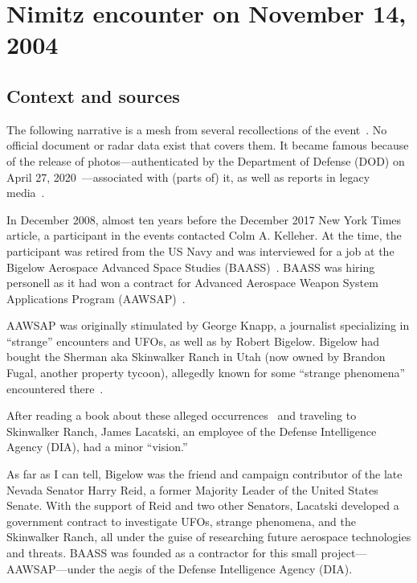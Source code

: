 \section{Nimitz encounter on November 14, 2004}
\label{2023-UFO-part-History-chapter-2004-2023-Nimitz}

\subsection{Context and sources}

The following narrative is a mesh from several recollections of the event~\cite{NimitzSCURep2019Mar,Chierici2015Mar,Mizokami2017Dec,Powerfuljre2019Oct}.
No official document or radar data exist that covers them. It became famous because of the release of photos---authenticated by the Department of Defense (DOD) on April 27, 2020~\cite{DOD2020}---associated with (parts of) it, as well as reports in legacy media~\cite{CooperNYT2017,BryanBender2017}.

In December 2008, almost ten years before the December 2017 New York Times article,
a participant in the events contacted Colm A. Kelleher.
At the time, the participant was retired from the US Navy and was interviewed for a job at the
Bigelow Aerospace Advanced Space Studies (BAASS)~\cite[p.~41]{Lacatski-2021}.
BAASS was hiring personell as it had won a contract for
Advanced Aerospace Weapon System Applications Program (AAWSAP)~\cite{AAWSAP2008}.

AAWSAP was originally stimulated by George Knapp, a journalist specializing in ``strange'' encounters and UFOs,
as well as by Robert Bigelow. Bigelow had bought the
Sherman aka Skinwalker Ranch in Utah (now owned by Brandon Fugal, another property tycoon),
allegedly known for some ``strange phenomena'' encountered there~\cite{ShaefferSkeptic2022May}.

After reading a book about these alleged occurrences~\cite{ColmA.Kelleher2009Jul} and traveling to
Skinwalker Ranch, James Lacatski, an employee of the Defense Intelligence Agency (DIA),
 had a minor ``vision.''

As far as I can tell, Bigelow was the friend and campaign contributor of the late
Nevada Senator Harry Reid, a former Majority Leader of the United States Senate.
With the support of Reid and two other Senators,
Lacatski developed a government contract to investigate UFOs,
strange phenomena, and the Skinwalker Ranch, all under the guise of researching future aerospace technologies and threats.
BAASS was founded as a contractor for this small project---AAWSAP---under the aegis of the Defense Intelligence Agency (DIA).

